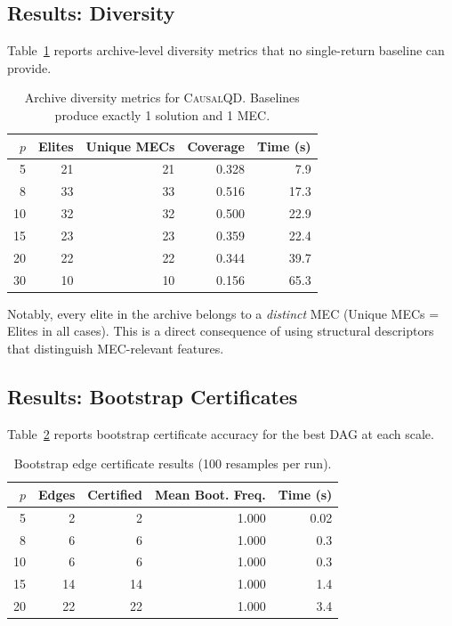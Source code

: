 \documentclass[11pt,a4paper]{article}
\begin{document}
\subsection{Results: Diversity}

Table~\ref{tab:diversity} reports archive-level diversity metrics that no single-return baseline can provide.

\begin{table}[t]
\centering
\caption{Archive diversity metrics for \textsc{CausalQD}. Baselines produce exactly 1 solution and 1 MEC.}
\label{tab:diversity}
\begin{tabular}{@{}r|rrrr@{}}
\toprule
$p$ & Elites & Unique MECs & Coverage & Time (s) \\
\midrule
5 & 21 & 21 & 0.328 & 7.9 \\
8 & 33 & 33 & 0.516 & 17.3 \\
10 & 32 & 32 & 0.500 & 22.9 \\
15 & 23 & 23 & 0.359 & 22.4 \\
20 & 22 & 22 & 0.344 & 39.7 \\
30 & 10 & 10 & 0.156 & 65.3 \\
\bottomrule
\end{tabular}
\end{table}

Notably, every elite in the archive belongs to a \emph{distinct} MEC (Unique MECs = Elites in all cases). This is a direct consequence of using structural descriptors that distinguish MEC-relevant features.

\subsection{Results: Bootstrap Certificates}

Table~\ref{tab:certificates} reports bootstrap certificate accuracy for the best DAG at each scale.

\begin{table}[t]
\centering
\caption{Bootstrap edge certificate results (100 resamples per run).}
\label{tab:certificates}
\begin{tabular}{@{}r|rrrr@{}}
\toprule
$p$ & Edges & Certified & Mean Boot. Freq. & Time (s) \\
\midrule
5 & 2 & 2 & 1.000 & 0.02 \\
8 & 6 & 6 & 1.000 & 0.3 \\
10 & 6 & 6 & 1.000 & 0.3 \\
15 & 14 & 14 & 1.000 & 1.4 \\
20 & 22 & 22 & 1.000 & 3.4 \\
\bottomrule
\end{tabular}
\end{table}
\end{document}
